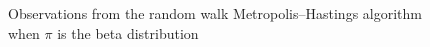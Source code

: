 \begin{frame}

    \vspace{2em}
    \begin{figure}
        \centering
        \caption{\label{f:rw_metropolis} Observations from the random walk Metropolis--Hastings
        algorithm when $\pi$ is the beta distribution}
    \end{figure}

\end{frame}



